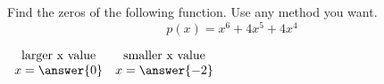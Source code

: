 \documentclass{ximera}
\author{David Kish}
\begin{document}
\begin{exercise}
Find the zeros of the following function. Use any method you want. 
\[
p(x)=x^6+4x^5+4x^4
\]

\begin{center}
$
\begin{array}{cc}
\text{larger x value} & \text{smaller x value}\\
x  = \answer{0} & x = \answer{-2}
\end{array}
$
\end{center}
\end{exercise}
\end{document}
